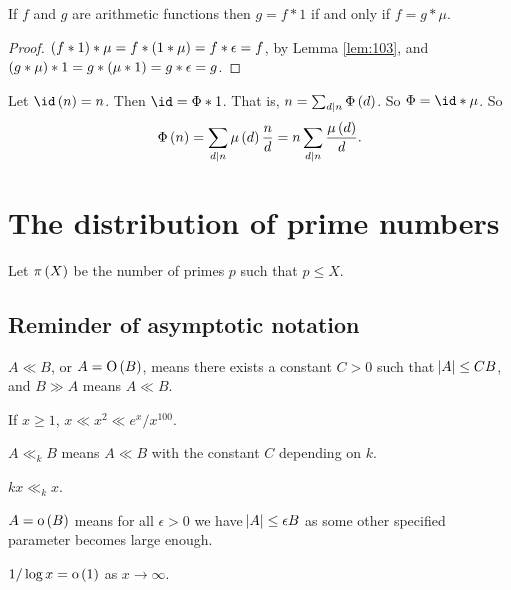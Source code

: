 \begin{proposition}
If $ f $ and $ g $ are arithmetic functions then $ g = f * 1 $ if and only if $ f = g * \mu $.
\end{proposition}

\begin{proof}
$ \br{f * 1} * \mu = f * \br{1 * \mu} = f * \epsilon = f $, by Lemma \ref{lem:103}, and $ \br{g * \mu} * 1 = g * \br{\mu * 1} = g * \epsilon = g $.
\end{proof}

\begin{example*}
Let $ \id\br{n} = n $. Then $ \id = \Phi * 1 $. That is, $ n = \sum_{d \mid n} \Phi\br{d} $. So $ \Phi = \id * \mu $. So
$$ \Phi\br{n} = \sum_{d \mid n} \mu\br{d}\dfrac{n}{d} = n\sum_{d \mid n} \dfrac{\mu\br{d}}{d}. $$
\end{example*}

\pagebreak

\section{The distribution of prime numbers}

Let $ \pi\br{X} $ be the number of primes $ p $ such that $ p \le X $.

\subsection{Reminder of asymptotic notation}

$ A \ll B $, or $ A = \O\br{B} $, means there exists a constant $ C > 0 $ such that $ \abs{A} \le CB $, and $ B \gg A $ means $ A \ll B $.

\begin{example*}
If $ x \ge 1 $, $ x \ll x^2 \ll e^x / x^{100} $.
\end{example*}

$ A \ll_k B $ means $ A \ll B $ with the constant $ C $ depending on $ k $.

\begin{example*}
$ kx \ll_k x $.
\end{example*}

$ A = \o\br{B} $ means for all $ \epsilon > 0 $ we have $ \abs{A} \le \epsilon B $ as some other specified parameter becomes large enough.

\begin{example*}
$ 1 / \log x = \o\br{1} $ as $ x \to \infty $.
\end{example*}

